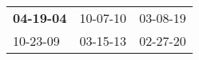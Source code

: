 \begin{supertabular}{p{0.33\columnwidth}p{0.33\columnwidth}p{0.33\columnwidth}}
 \textbf{04-19-04\textsuperscript{}} &  10-07-10\textsuperscript{} &  03-08-19\textsuperscript{} \\
          10-23-09\textsuperscript{} &  03-15-13\textsuperscript{} &  02-27-20\textsuperscript{} \\
\end{supertabular}
